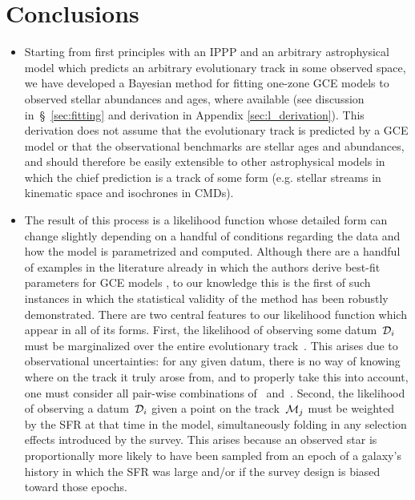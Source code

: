 \documentclass[ms.tex]{subfiles}
\begin{document}
\section{Conclusions}
\label{sec:conclusions}

\begin{itemize}

	\item Starting from first principles with an IPPP and an arbitrary
	astrophysical model which predicts an arbitrary evolutionary track in some
	observed space, we have developed a Bayesian method for fitting one-zone
	GCE models to observed stellar abundances and ages, where available (see
	discussion in~\S~\ref{sec:fitting} and derivation in Appendix
	\ref{sec:l_derivation}).
	This derivation does not assume that the evolutionary track is predicted by
	a GCE model or that the observational benchmarks are stellar ages and
	abundances, and should therefore be easily extensible to other
	astrophysical models in which the chief prediction is a track of some form
	(e.g. stellar streams in kinematic space and isochrones in CMDs).

	\item The result of this process is a likelihood function whose detailed
	form can change slightly depending on a handful of conditions regarding the
	data and how the model is parametrized and computed.
	Although there are a handful of examples in the literature already in which
	the authors derive best-fit parameters for GCE models
	\citep[e.g.][]{Kirby2011, Spitoni2020, Spitoni2021, Hasselquist2021}, to
	our knowledge this is the first of such instances in which the statistical
	validity of the method has been robustly demonstrated.
	There are two central features to our likelihood function which appear in
	all of its forms.
	First, the likelihood of observing some datum~$\mathcal{D}_i$ must be
	marginalized over the entire evolutionary track~.
	This arises due to observational uncertainties: for any given datum, there
	is no way of knowing where on the track it truly arose from, and to
	properly take this into account, one must consider all pair-wise
	combinations of~ and~.
	Second, the likelihood of observing a datum~$\mathcal{D}_i$ given a point on
	the track~$\mathcal{M}_j$ must be weighted by the SFR at that time in the
	model, simultaneously folding in any selection effects introduced by the
	survey.
	This arises because an observed star is proportionally more likely to have
	been sampled from an epoch of a galaxy's history in which the SFR was
	large and/or if the survey design is biased toward those epochs.


\end{itemize}
\end{document}
